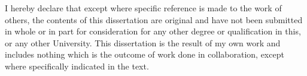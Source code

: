 \begin{declaration}
I hereby declare that except where specific reference is made to the
work of others, the contents of this dissertation are original and
have not been submitted in whole or in part for consideration for
any other degree or qualification in this, or any other University.
This dissertation is the result of my own work and includes nothing
which is the outcome of work done in collaboration, except where specifically
indicated in the text.

\begin{comment}
This dissertation contains fewer than 65,000 words including appendices,
bibliography, footnotes, tables and equations and has less than 150
figures.
\end{comment}
\end{declaration}

